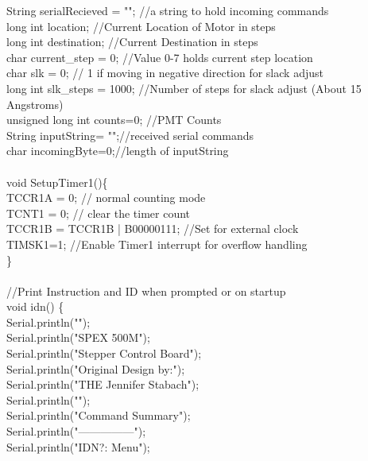 {String serialRecieved = "";\tabto*{7.5cm} //a string to hold incoming commands\\
long int location; \tabto*{7.5cm}     //Current Location of Motor in steps\\
long int destination;\tabto*{7.5cm}   //Current Destination in steps\\
char current\_step = 0;\tabto*{7.5cm} //Value 0-7 holds current step location\\
char slk = 0;\tabto*{7.5cm}  //  1 if moving in negative direction for slack adjust\\
long int slk\_steps = 1000;\tabto*{7.5cm}  //Number of steps for slack adjust (About 15 Angstroms)\\
unsigned long int counts=0;\tabto*{7.5cm} //PMT Counts\\
String inputString= "";\tabto*{7.5cm}//received serial commands\\
char incomingByte=0;\tabto*{7.5cm}//length of inputString\\
\\
void SetupTimer1()\{\\
\tabto*{.5cm}	TCCR1A = 0;  \tabto*{7.5cm}           // normal counting mode \\
\tabto*{.5cm}	TCNT1 = 0;      \tabto*{7.5cm}        // clear the timer count \\
\tabto*{.5cm}	TCCR1B = TCCR1B | B00000111; \tabto*{7.5cm} //Set for external clock\\
\tabto*{.5cm}	TIMSK1=1;\tabto*{7.5cm}  //Enable Timer1 interrupt for overflow handling\\
\}\\
\\
//Print Instruction and ID when prompted or on startup\\
void idn() \{ \\ 
\tabto*{.5cm}	Serial.println("");\\
\tabto*{.5cm}	Serial.println("SPEX 500M");\\
\tabto*{.5cm}	Serial.println("Stepper Control Board");\\
\tabto*{.5cm}	Serial.println("Original Design by:");\\
\tabto*{.5cm}	Serial.println("THE Jennifer Stabach");\\
\tabto*{.5cm}	Serial.println("");\\
\tabto*{.5cm}	Serial.println("Command Summary");\\
\tabto*{.5cm}	Serial.println("---------------");\\
\tabto*{.5cm}	Serial.println("IDN?:   Menu");\\
}
